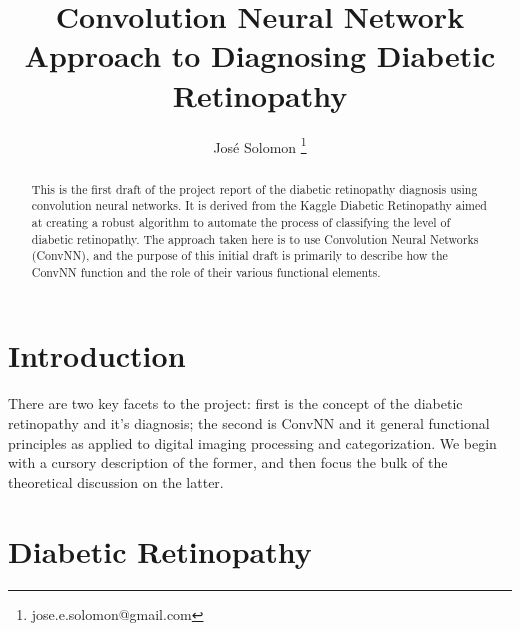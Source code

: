 \documentclass[letterpaper,12pt]{article}
\title{Convolution Neural Network Approach to Diagnosing Diabetic Retinopathy}
\author{Jos\'e Solomon \thanks{jose.e.solomon@gmail.com} }
\date{}
\begin{document}
\maketitle
\begin{abstract}
This is the first draft of the project report of the diabetic retinopathy diagnosis using convolution neural networks. It is derived from the Kaggle Diabetic Retinopathy \cite{kaggle} aimed at creating a robust algorithm to automate the process of classifying the level of diabetic retinopathy. The approach taken here is to use Convolution Neural Networks (ConvNN), and the purpose of this initial draft is primarily to describe how the ConvNN function and the role of their various functional elements.
\end{abstract}

\tableofcontents

\section{Introduction}

There are two key facets to the project: first is the concept of the diabetic retinopathy and it's diagnosis; the second is ConvNN and it general functional principles as applied to digital imaging processing and categorization. We begin with a cursory description of the former, and then focus the bulk of the theoretical discussion on the latter.

\section{Diabetic Retinopathy}
\end{document}
